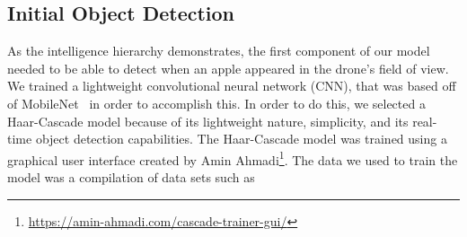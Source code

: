 \subsection{Initial Object Detection}
As the intelligence hierarchy demonstrates, the first component of our model needed to be able to detect when an apple appeared in the drone's field of view. 
We trained a lightweight convolutional neural network (CNN), that was based off of MobileNet~\cite{Sandler2018,PyTorchMobileNet} in order to accomplish this. 
In order to do this, we selected a Haar-Cascade model because of its lightweight nature, simplicity, and its real-time object detection capabilities. The Haar-Cascade model was trained using a graphical user interface created by Amin Ahmadi\footnote{\url{https://amin-ahmadi.com/cascade-trainer-gui/}}. The data we used to train the model was a compilation of data sets such as  